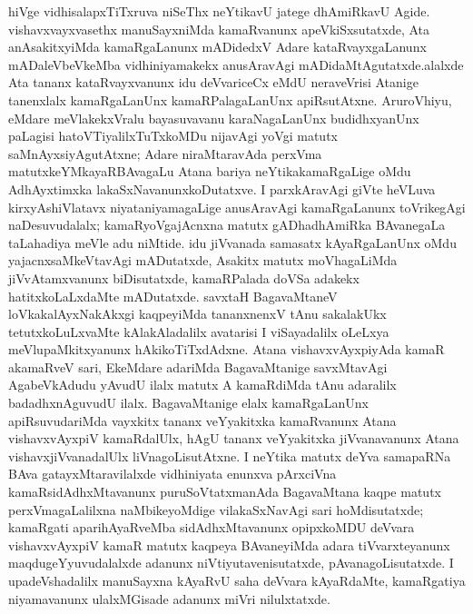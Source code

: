 hiVge vidhisalapxTiTxruva niSeThx neYtikavU jatege dhAmiRkavU Agide. vishavxvayxvasethx manuSayx\-niMda kamaRvanunx apeVkiSxsutatxde, Ata anAsakitxyiMda kamaRgaLanunx mADidedxV Adare kataRvayxgaLanunx mADaleVbeVkeMba vidhiniyamakekx anusAravAgi mADidaMtAgutatxde.\break alalxde Ata tananx kataRvayxvanunx idu deVvariceCx eMdU neraveVrisi Atanige tanenxlalx kamaR\-gaLanUnx kamaRPalagaLanUnx apiRsutAtxne. AruroVhiyu, eMdare meVlakekxVralu bayasuvavanu karaNagaLanUnx budidhxyanUnx paLagisi hatoVTiyalilxTuTxkoMDu nija\break\-vAgi yoVgi matutx saMnAyxsiyAgutAtxne; Adare niraMtaravAda perxVma matutx\break keYMkayaRBAvagaLu Atana bariya neYtikakamaRgaLige oMdu AdhAyxtimxka lakaSxNavanunx\break koDu\-tatxve. I parxkAravAgi giVte heVLuva kirxyAshiVlatavx niyataniyamagaLige anusAra\break\-vAgi kamaRgaLanunx toVrikegAgi naDesuvudalalx; kamaRyoVgajAcnxna matutx gADha\break dhAmiRka BAvanegaLa taLahadiya meVle adu niMtide. idu jiVvanada samasatx kAyaR\-gaLanUnx oMdu yajacnxsaMkeVtavAgi mADutatxde, Asakitx matutx moVhagaLiMda jiVvAtamx\-vanunx biDisutatxde, kamaRPalada doVSa adakekx hatitxkoLaLxdaMte mADutatxde. savxtaH Baga\-vaMtaneV loVkakalAyxNakAkxgi kaqpeyiMda tananxnenxV tAnu sakalakUkx tetutxkoLuLxvaMte kAla\-kAladalilx avatarisi I viSayadalilx oLeLxya meVlupaMkitxyanunx hAkikoTiTxdAdxne. Atana vishavxvAyxpiyAda kamaR akamaRveV sari, EkeMdare adariMda BagavaMtanige savxMtavAgi AgabeVkAdudu yAvudU ilalx matutx A kamaRdiMda tAnu adaralilx badadhxnAgu\-vudU ilalx. BagavaMtanige elalx kamaRgaLanUnx apiRsuvudariMda vayxkitx tananx veYyakitxka kamaR\-vanunx Atana vishavxvAyxpiV kamaRdalUlx, hAgU tananx veYyakitxka jiVvanavanunx Atana vishavx\-jiVvanadalUlx liVnagoLisutAtxne. I neYtika matutx deYva samapaRNa BAva gatayxMtara\-vilalxde vidhiniyata enunxva pArxciVna kamaRsidAdhxMtavanunx puruSoVtatxmanAda Baga\-vaMtana kaqpe matutx perxVmagaLalilxna naMbikeyoMdige vilakaSxNavAgi sari hoMdisutatxde; kamaRgati aparihAyaRveMba sidAdhxMtavanunx opipxkoMDU deVvara vishavxvAyxpiV kamaR matutx kaqpeya BAvaneyiMda adara tiVvarxteyanunx maqdugeYyuvudalalxde adanunx niVtiyutavenisutatxde, pAvanagoLisutatxde. I upadeVshadalilx manuSayxna kAyaRvU saha deVvara kAyaRdaMte, kamaRgatiya niyamavanunx ulalxMGisade adanunx miVri nilulxtatxde.

